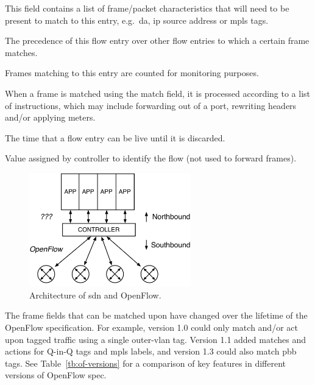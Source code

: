 \begin{description}[leftmargin=!,labelwidth=\widthof{\bfseries Instructions}]
	\item[Match] This field contains a list of frame/packet characteristics that will need to be present to match to this entry, e.g.\ \ac{da}, \ac{ip} source address or \ac{mpls} tags.
	\item[Priority] The precedence of this flow entry over other flow entries to which a certain frame matches.
	\item[Counters] Frames matching to this entry are counted for monitoring purposes.
	\item[Instructions] When a frame is matched using the match field, it is processed according to a list of instructions, which may include forwarding out of a port, rewriting headers and/or applying meters.
	\item[Timeouts] The time that a flow entry can be live until it is discarded.
	\item[Cookie] Value assigned by controller to identify the flow (not used to forward frames).
\end{description}

\begin{figure}[!h]
	\centering
	\includegraphics[width=7cm]{./includes/of-arch.pdf}
	\caption{Architecture of \ac{sdn} and OpenFlow.}
	\label{fig:of-arch}
\end{figure}

The frame fields that can be matched upon have changed over the lifetime of the OpenFlow specification. For example, version 1.0 could only match and/or act upon tagged traffic using a single outer-\acs{vlan} tag. Version 1.1 added matches and actions for Q-in-Q tags and \ac{mpls} labels, and version 1.3 could also match \ac{pbb} tags. See Table~\ref{tb:of-versions} for a comparison of key features in different versions of OpenFlow spec. 

